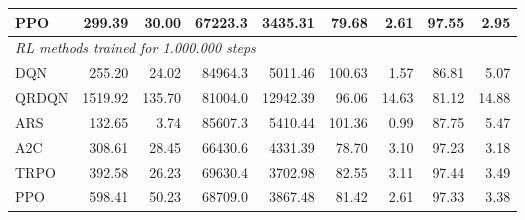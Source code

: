 \begin{samepage}
\begin{center}
\begin{tabular}{l|rr|rr|rr|rr}
    PPO          &   299.39 &    30.00 &    67223.3 &    3435.31 &   79.68 &    2.61 &   97.55 &    2.95 \\
    \midrule
    \multicolumn{9}{l}{\textit{RL methods trained for 1.000.000 steps}} \\
    \midrule
    DQN          &   255.20 &    24.02 &    84964.3 &    5011.46 &  100.63 &    1.57 &   86.81 &    5.07 \\
    QRDQN        &  1519.92 &   135.70 &    81004.0 &   12942.39 &   96.06 &   14.63 &   81.12 &   14.88 \\
    ARS          &   132.65 &     3.74 &    85607.3 &    5410.44 &  101.36 &    0.99 &   87.75 &    5.47 \\
    A2C          &   308.61 &    28.45 &    66430.6 &    4331.39 &   78.70 &    3.10 &   97.23 &    3.18 \\
    TRPO         &   392.58 &    26.23 &    69630.4 &    3702.98 &   82.55 &    3.11 &   97.44 &    3.49 \\
    PPO          &   598.41 &    50.23 &    68709.0 &    3867.48 &   81.42 &    2.61 &   97.33 &    3.38 \\
    \bottomrule
  \end{tabular}
\end{center}
\end{samepage}

